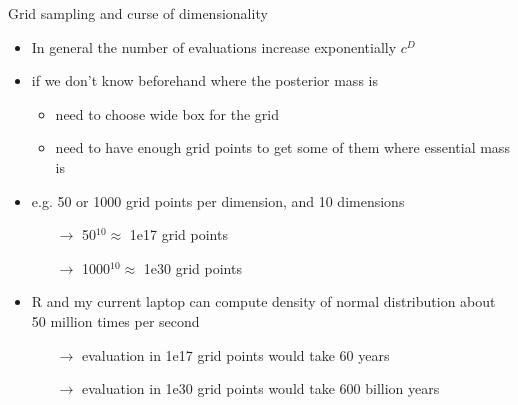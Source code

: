 \documentclass[english,t]{beamer}
\begin{document}
\begin{frame}{Grid sampling and curse of dimensionality}

  \begin{itemize}
  \item In general the number of evaluations increase exponentially $c^D$
      \item if we don't know beforehand where the posterior mass is
        \begin{itemize}
          \item need to choose wide box for the grid
          \item need to have enough grid points to get some of them
            where essential mass is
          \end{itemize}
          \pause
      \item e.g. 50 or 1000 grid points per dimension, and 10 dimensions
        \begin{itemize}
        \item[$\rightarrow$] 50$^{10} \approx$ 1e17 grid points
        \item[$\rightarrow$] 1000$^{10} \approx$ 1e30 grid points
        \end{itemize}
      \item R and my current laptop can compute density of normal
        distribution about 50 million times per second
        \begin{itemize}
        \item[$\rightarrow$] evaluation in 1e17 grid points would take
           60 years %
        \item[$\rightarrow$] evaluation in 1e30 grid points would take
           600 billion years %
        \end{itemize}
 \end{itemize}
\vfill
 
\end{frame}
\end{document}
